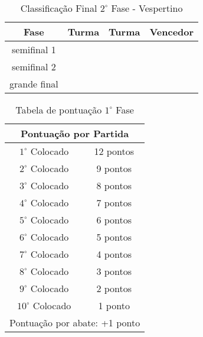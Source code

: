 \documentclass[10pt]{article}
\begin{document}
    \begin{table}[H]
        \caption{Classificação Final $2^\circ$ Fase - Vespertino}
        \label{tab:tab-matutino}
        \begin{center}
            \begin{tabular}{|c|c|c|c|}
                \hline
                \textbf{Fase} & \textbf{Turma} & \textbf{Turma} & \textbf{Vencedor}\\ \hline
                semifinal 1 & & & \\ \hline
                semifinal 2 & & & \\ \hline
                grande final & & & \\ \hline

            \end{tabular}
        \end{center}
    \end{table}

    \begin{table}[H]
        \caption{Tabela de pontuação $1^\circ$ Fase}
        \begin{center}
            \begin{tabular}{c c}
                \hline
                \multicolumn{2}{c}{Pontuação por Partida}\\
                \hline
                $1^\circ$  Colocado & 12 pontos \\
                $2^\circ$  Colocado & 9 pontos \\
                $3^\circ$  Colocado & 8 pontos \\
                $4^\circ$  Colocado & 7 pontos \\
                $5^\circ$  Colocado & 6 pontos \\
                $6^\circ$  Colocado & 5 pontos \\
                $7^\circ$  Colocado & 4 pontos \\
                $8^\circ$  Colocado & 3 pontos \\
                $9^\circ$  Colocado & 2 pontos \\
                $10^\circ$ Colocado & 1 ponto \\
                \hline
                \multicolumn{2}{c}{Pontuação por abate: +1 ponto}\\
            \end{tabular}
        \end{center}

    \end{table}
\end{document}
